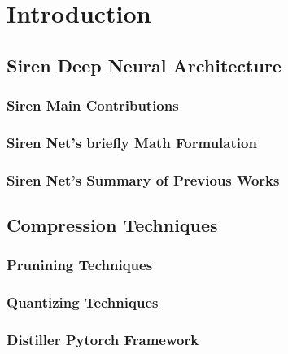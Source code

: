 



\section{Introduction}
\subsection{Siren Deep Neural Architecture}



\subsubsection{Siren Main Contributions}

\subsubsection{Siren Net's briefly Math Formulation}

\subsubsection{Siren Net's Summary of Previous Works}




\subsection{Compression Techniques}

\subsubsection{Prunining Techniques}
\subsubsection{Quantizing Techniques}
\subsubsection{Distiller Pytorch Framework}